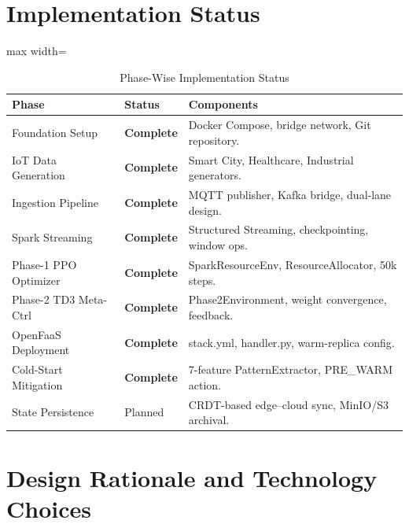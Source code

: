 \section{Implementation Status}
\label{sec:impl_status}

\begin{table}[H]
\centering
\caption{Phase-Wise Implementation Status}
\label{tab:impl_summary}
\begin{adjustbox}{max width=\textwidth}
\begin{tabular}{|p{4.2cm}|p{2.5cm}|p{7.2cm}|}
\hline
\textbf{Phase} & \textbf{Status} & \textbf{Components} \\ \hline
Foundation Setup      & \textbf{Complete} & Docker Compose, bridge network, Git repository. \\ \hline
IoT Data Generation   & \textbf{Complete} & Smart City, Healthcare, Industrial generators. \\ \hline
Ingestion Pipeline    & \textbf{Complete} & MQTT publisher, Kafka bridge, dual-lane design. \\ \hline
Spark Streaming       & \textbf{Complete} & Structured Streaming, checkpointing, window ops. \\ \hline
Phase-1 PPO Optimizer & \textbf{Complete} & SparkResourceEnv, ResourceAllocator, 50k steps. \\ \hline
Phase-2 TD3 Meta-Ctrl & \textbf{Complete} & Phase2Environment, weight convergence, feedback. \\ \hline
OpenFaaS Deployment   & \textbf{Complete} & stack.yml, handler.py, warm-replica config. \\ \hline
Cold-Start Mitigation & \textbf{Complete} & 7-feature PatternExtractor, PRE\_WARM action. \\ \hline
State Persistence     & Planned           & CRDT-based edge--cloud sync, MinIO/S3 archival. \\ \hline
\end{tabular}
\end{adjustbox}
\end{table}

\section{Design Rationale and Technology Choices}

